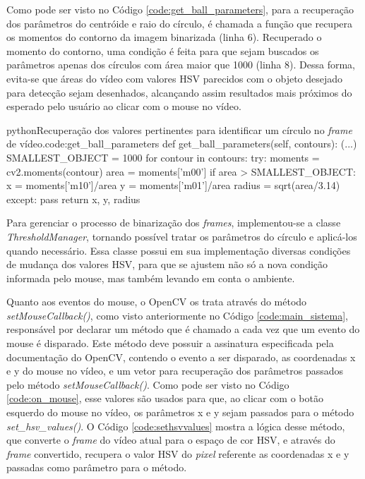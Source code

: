 Como pode ser visto no Código \ref{code:get_ball_parameters}, para a recuperação dos parâmetros do centróide e raio do círculo, é chamada a função que recupera os momentos do contorno da imagem binarizada (linha 6). Recuperado o momento do contorno, uma condição é feita para que sejam buscados os parâmetros apenas dos círculos com área maior que 1000 (linha 8). Dessa forma, evita-se que áreas do vídeo com valores HSV parecidos com o objeto desejado para detecção sejam desenhados, alcançando assim resultados mais próximos do esperado pelo usuário ao clicar com o mouse no vídeo.\newline

\begin{code}{python}{Recuperação dos valores pertinentes para identificar um círculo no \textit{frame} de vídeo.}{code:get_ball_parameters}
def get_ball_parameters(self, contours):
	(...)
	SMALLEST_OBJECT = 1000
	for contour in contours:
		try:
			moments = cv2.moments(contour)
			area = moments['m00']
			if area > SMALLEST_OBJECT:
				x = moments['m10']/area
				y = moments['m01']/area
				radius = sqrt(area/3.14)
		except:
			pass
	return x, y, radius
\end{code}

Para gerenciar o processo de binarização dos \textit{frames}, implementou-se a classe \textit{ThresholdManager}, tornando possível tratar os parâmetros do círculo e aplicá-los quando necessário. Essa classe possui em sua implementação diversas condições de mudança dos valores HSV, para que se ajustem não só a nova condição informada pelo mouse, mas também levando em conta o ambiente.

Quanto aos eventos do mouse, o OpenCV os trata através do método \textit{setMouseCallback()}, como visto anteriormente no Código \ref{code:main_sistema}, responsável por declarar um método que é chamado a cada vez que um evento do mouse é disparado. Este método deve possuir a assinatura especificada pela documentação do OpenCV, contendo o evento a ser disparado, as coordenadas x e y do mouse no vídeo, e um vetor para recuperação dos parâmetros passados pelo método \textit{setMouseCallback()}. Como pode ser visto no Código \ref{code:on_mouse},  esse valores são usados para que, ao clicar com o botão esquerdo do mouse no vídeo, os parâmetros x e y sejam passados para o método \textit{set\_hsv\_values()}. O Código \ref{code:sethsvvalues} mostra a lógica desse método, que converte o \textit{frame} do vídeo atual para o espaço de cor HSV, e através do \textit{frame} convertido, recupera o valor HSV do \textit{pixel} referente as coordenadas x e y passadas como parâmetro para o método.

